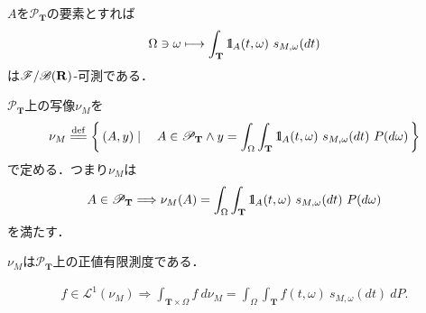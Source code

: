 	\begin{screen}
		\begin{thm}
			$A$を$\mathscr{P}_{\mathbf{T}}$の要素とすれば
			\begin{align}
				\Omega \ni \omega \longmapsto \int_{\mathbf{T}} \mbox{1}\hspace{-0.25em}\mbox{l}_A(t,\omega)\ s_{M,\omega}(dt)
			\end{align}
			は$\mathscr{F}/\mathscr{B}(\mathbf{R})$-可測である．
		\end{thm}
	\end{screen}
	
	\begin{prf}
	\end{prf}
	
	$\mathscr{P}_{\mathbf{T}}$上の写像$\nu_M$を
	\begin{align}
		\nu_M \defeq \Set{(A,y)}{A \in \mathscr{P}_{\mathbf{T}} \wedge y = 
		\int_\Omega \int_{\mathbf{T}} \defunc_A(t,\omega)\ s_{M,\omega}(dt)\ P(d\omega)}
	\end{align}
	で定める．つまり$\nu_M$は
	\begin{align}
		A \in \mathscr{P}_{\mathbf{T}} \Longrightarrow
		\nu_M(A) = \int_\Omega \int_{\mathbf{T}} \defunc_A(t,\omega)\ s_{M,\omega}(dt)\ P(d\omega)
	\end{align}
	を満たす．
	
	\begin{screen}
		\begin{thm}[二乗可積分マルチンゲールで構成する測度]
			$\nu_M$は$\mathscr{P}_{\mathbf{T}}$上の正値有限測度である．
		\end{thm}
	\end{screen}
	
	\begin{screen}
		\begin{thm}[可積分可予測過程の積分表現]
			\begin{align}
				f \in \mathscr{L}^1(\nu_M) \Longrightarrow 
				\int_{\mathbf{T} \times \Omega} f\ d\nu_M = \int_\Omega \int_{\mathbf{T}} f(t,\omega)\ s_{M,\omega}(dt)\ dP.
			\end{align}
		\end{thm}
	\end{screen}
	
	\begin{comment}
	いま，$\mathscr{P}_{\mathbf{T}}$の要素に対する定義関数の全体の線型包を$\mathscr{S}$と定める:
	\begin{align}
		\mathscr{S} \defeq \operatorname{Span}\Set{\defunc_A}{A \in \mathscr{P}_{\mathbf{T}}}.
	\end{align}
	このとき$\mathscr{S}$は$\mathscr{L}^2(\nu_M)$において，セミノルム$\Norm{\cdot}{\mathscr{L}^2(\nu_M)}$に関して稠密となる．
	
	\begin{screen}
		\begin{thm}
			
		\end{thm}
	\end{screen}
	\end{comment}